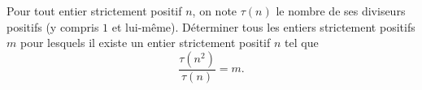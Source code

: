 Pour tout entier strictement positif $n$, on note $\tau(n)$ le nombre de ses diviseurs positifs (y compris $1$ et lui-même). Déterminer tous les entiers strictement positifs $m$ pour lesquels il existe un entier strictement positif $n$ tel que
\[ \frac{\tau(n^{2})}{\tau(n)} = m. \]
